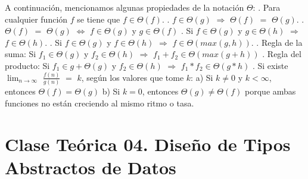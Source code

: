 \documentclass[10pt,a4paper]{article}
\begin{document}
A continuación, mencionamos algunas propiedades de la notación $\Theta$:
\newline
{}. Para cualquier función $f$ se tiene que $f \in \Theta(f)$.
\newline
{}. $f \in \Theta(g)$ $\Rightarrow$ $\Theta(f)$ $=$ $\Theta(g)$. 
\newline
{}. $\Theta(f)$ $=$ $\Theta(g)$ $\Leftrightarrow$ $f \in \Theta(g)$ y $g \in \Theta(f)$
\newline
{}. Si $f \in \Theta(g)$ y $g \in \Theta(h)$ $\Rightarrow$ $f \in \Theta(h)$.
\newline
{}. Si $f \in \Theta(g)$ y $f \in \Theta(h)$ $\Rightarrow$ $f \in \Theta(max(g,h))$. 
\newline
{}. Regla de la suma: Si $f_{1} \in \Theta(g)$ y $f_{2} \in \Theta(h)$ $\Rightarrow$ $f_{1} + f_{2} \in \Theta(max(g + h))$   
\newline
{}. Regla del producto: Si $f_{1} \in g + \Theta(g)$ y $f_{2} \in \Theta(h)$ $\Rightarrow$ $f_{1} * f_{2} \in \Theta(g * h)$ 
\newline
{}. Si existe $\displaystyle \lim_{n \to \infty}$ $\displaystyle \frac{f(n)}{g(n)}$ $=$ $k$, según los valores que tome $k$:
\newline
\newline
a) Si $k \neq 0$ y $k < \infty$, entonces $\Theta(f) = \Theta(g)$  
\newline
\newline
b) Si $k = 0$, entonces $\Theta(g) \neq \Theta(f)$ porque ambas funciones no están creciendo al mismo ritmo o tasa.
\newpage

\section{Clase Teórica 04. Diseño de Tipos Abstractos de Datos}
\end{document}
